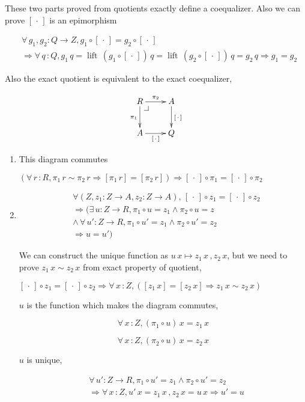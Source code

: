 \documentclass[envcountsame]{llncs}
\makeatletter
\newcommand{\dotph}{\,\cdot\,}
\providecommand{\class}[1]{[#1]}
\DeclareMathOperator{\lift}{lift}
\newcommand{\pullbackcorner}[1][dr]{\save*!/#1-1.2pc/#1:(-1,1)@^{|-}\restore}
\makeatother
\begin{document}
These two parts proved from quotients
exactly define a coequalizer. Also we can prove $\class\dotph$ is an epimorphism

\begin{align*}
&\forall\, g_1,g_2 : Q \to Z, g_1 \circ \class\dotph = g_2 \circ
\class\dotph\\
&\Rightarrow  \forall \,q \,\colon Q,  g_{1} \,q = \lift \, (g_1 \circ \class\dotph) \, q = \lift \, (g_2 \circ \class\dotph) \, q = g_2\, q \Rightarrow g_1 = g_2
\end{align*}

Also the exact quotient is equivalent to the exact coequalizer,

\[\xymatrix{
R\pullbackcorner\ar[r]^{\pi_2}\ar[d]_{\pi_1} & A\ar[d]^{\class\dotph} \\
A\ar[r]_{\class\dotph} & Q
}\]

\begin{enumerate}

\item This diagram commutes

$(\forall \,r\, \colon R, \pi_1 \, r \sim \pi_2 \, r \Rightarrow\class{\pi_1 \,r} = \class{\pi_2 \, r}) \Rightarrow \class\dotph \circ \pi_1 = \class\dotph\circ \pi_2$


\item 
\begin{align*}
&\forall (Z , z_1 \colon Z \to A, z_2 \colon Z \to A), \,
\class{\dotph} \circ z_1 = \class\dotph \circ z_2 \\
&\Rightarrow ( \exists \,u : Z \to R, \pi_1 \circ u = z_1 \wedge  \pi_2
\circ u = z \\
&\wedge \,\forall \,u' \colon Z \to R, \pi_1 \circ u' = z_1 \wedge
\pi_2 \circ u' = z_2 \\
&\Rightarrow u = u') 
\end{align*}

We  can construct the unique function as $u \,x \mapsto z_1 \,x \,, z_2\, x$, but we need to prove $z_1 \,x\sim z_2 \,x$ from exact property of quotient, 

$\class{\dotph} \circ z_1 = \class\dotph \circ z_2 \Rightarrow \forall \,x\, \colon Z, (\class{z_1\,x}=\class{z_2 \,x} \Rightarrow z_{1} \,x \sim z_2 \, x) $

$u$ is the function which makes the diagram commutes,

$$\forall \,x\,\colon Z, (\pi_1 \circ u) \, x = z_1 \,x$$

$$\forall \,x\,\colon Z, (\pi_2 \circ u) \, x = z_2 \,x$$

$u$ is unique,


\begin{align*}
&\forall \,u' \colon Z \to R, \pi_1 \circ u' = z_1 \wedge  \pi_2 \circ u'  = z_2\\ 
&\Rightarrow \forall \,x\,\colon Z, u' \,x = z_1 \,x\,,z_2\,x=u\,x \Rightarrow u' = u
\end{align*}

\end{enumerate}
\end{document}
